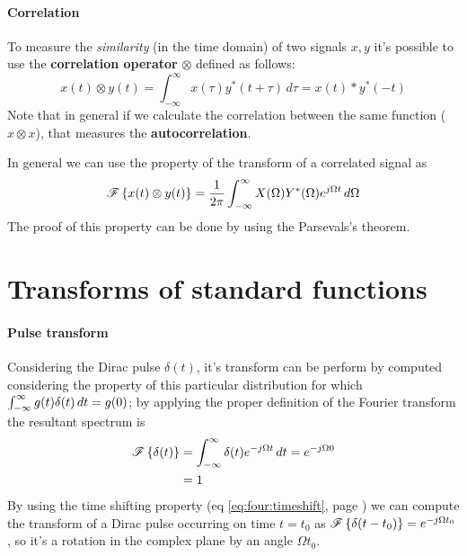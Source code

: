 		 \paragraph{Correlation} To measure the \textit{similarity} (in the time domain) of two signals $x,y$ it's possible to use the \textbf{correlation operator} $\otimes$ defined as follows:
		\begin{equation}
			x(t) \otimes y(t) = \int_{-\infty}^\infty x(\tau) y^*(t+\tau)\, d\tau = x(t)*y^*(-t) 
		\end{equation}
		Note that in general if we calculate the correlation between the same function ($x\otimes x$), that measures the \textbf{autocorrelation}.
		
		In general we can use the property of the transform of a correlated signal as
		\begin{equation}
			\mathscr{F}\left\{ x(t)\otimes y(t) \right\} = \frac 1{2\pi} \int_{-\infty}^\infty X(\Omega) Y^*(\Omega) e^{j\Omega t} \, d\Omega
		\end{equation}
		The proof of this property can be done by using the Parsevals's theorem.
	
	
\section{Transforms of standard functions}
	
	\paragraph{Pulse transform} Considering the Dirac pulse $\delta(t)$, it's transform can be perform by computed considering the property of this particular distribution for which $\int_{-\infty}^\infty g(t)\delta(t)\, dt = g(0)$; by applying the proper definition of the Fourier transform the resultant spectrum is
	\begin{align*}
	\begin{split}
		\mathscr{F}\left\{ \delta(t) \right\} & = \int_{-\infty}^\infty \delta(t) e^{-j\Omega t}  \, dt = e^{-j\Omega 0} \\ & = 1
	\end{split}
	\end{align*}
	By using the  time shifting property (eq \ref{eq:four:timeshift}, page \pageref{eq:four:timeshift}) we can compute the transform of a Dirac pulse occurring on time $t = t_0$ as $\mathscr{F}\left\{ \delta(t-t_0) \right\} = e^{-j\Omega t_0}$, so it's a rotation in the complex plane by an angle $\Omega t_0$.
	
